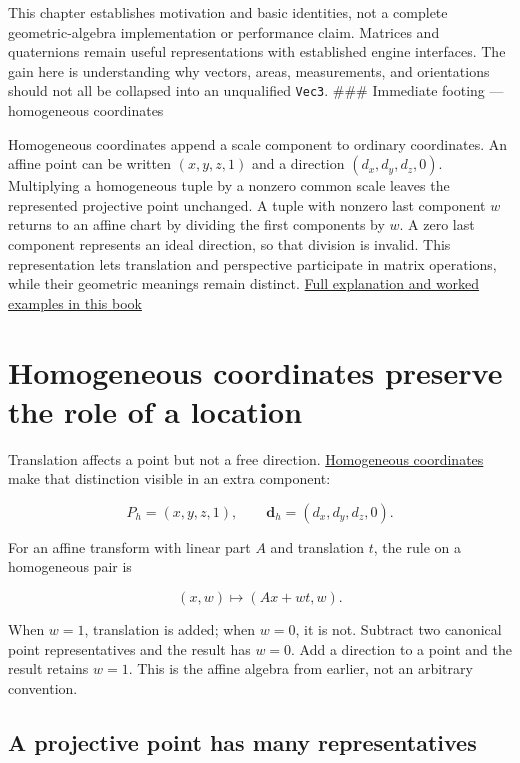 This chapter establishes motivation and basic identities, not a complete geometric-algebra implementation or performance claim. Matrices and quaternions remain useful representations with established engine interfaces. The gain here is understanding why vectors, areas, measurements, and orientations should not all be collapsed into an unqualified \texttt{Vec3}. \#\#\# Immediate footing --- homogeneous coordinates

Homogeneous coordinates append a scale component to ordinary coordinates. An affine point can be written \((x,y,z,1)\) and a direction \((d_x,d_y,d_z,0)\). Multiplying a homogeneous tuple by a nonzero common scale leaves the represented projective point unchanged. A tuple with nonzero last component \(w\) returns to an affine chart by dividing the first components by \(w\). A zero last component represents an ideal direction, so that division is invalid. This representation lets translation and perspective participate in matrix operations, while their geometric meanings remain distinct. \hyperref[01-foundations-i-ch018-homogeneous-coordinates-preserve-the-role-of-a-location]{Full explanation and worked examples in this book}

\section{Homogeneous coordinates preserve the role of a location}\label{01-foundations-i-ch018-homogeneous-coordinates-preserve-the-role-of-a-location}

Translation affects a point but not a free direction. \hyperref[01-foundations-i-ch019-figure-m6---follow-one-point-through-named-spaces]{Homogeneous coordinates} make that distinction visible in an extra component:

\[
P_h=(x,y,z,1),\qquad \mathbf d_h=(d_x,d_y,d_z,0).
\]

For an affine transform with linear part \(A\) and translation \(t\), the rule on a homogeneous pair is

\[
(x,w)\longmapsto(Ax+wt,w).
\]

When \(w=1\), translation is added; when \(w=0\), it is not. Subtract two canonical point representatives and the result has \(w=0\). Add a direction to a point and the result retains \(w=1\). This is the affine algebra from earlier, not an arbitrary convention.

\subsection{A projective point has many representatives}\label{01-foundations-i-ch018-a-projective-point-has-many-representatives}

